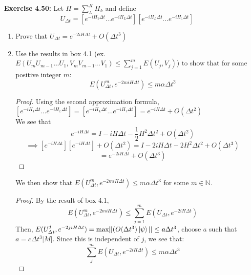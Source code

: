 \documentclass{article}
\begin{document}
\begin{tcolorbox}\textbf{Exercise 4.50:} Let $H = \sum_L^K H_k$ and define
	$$U_{\Delta t} = [e^{-iH_1 \Delta t} \dots e^{-i H_L \Delta t}][ e^{-i H_L \Delta t} \dots e^{-iH_1 \Delta t}]$$
	\begin{enumerate}
		\item Prove that $U_{\Delta t} = e^{-2i H \Delta t} + O(\Delta t^3)$
		\item Use the results in box 4.1 (ex. $E(U_m U_{m-1} \dots U_1, V_m V_{m-1} \dots V_1) \leq \sum^m_{j=1} E(U_j, V_j)$) to show that for some positive integer $m$:
			$$E(U^m_{\Delta t}, e^{-2miH\Delta t}) \leq m \alpha \Delta t^3$$
		\begin{proof}
		Using the second approximation formula, $[e^{-iH_1 \Delta t} \dots e^{-i H_L \Delta t}] = [ e^{-i H_L \Delta t} \dots e^{-iH_1 \Delta t}] = e^{-iH\Delta t} + O(\Delta t^2)$\\
			We see that
			$$e^{-iH\Delta t} = I - iH\Delta t - \frac12 H^2\Delta t^2 + O(\Delta t^2)$$
			$$\implies [e^{-iH\Delta t}] [e^{-iH \Delta t}]  + O(\Delta t^2) = I - 2iH\Delta t - 2H^2 \Delta t^2 + O(\Delta t^3) $$
			$$=e^{-2iH\Delta t} + O(\Delta t^3)$$
		\end{proof}
		We then show that $E(U^m_{\Delta t}, e^{-2miH\Delta t}) \leq m\alpha \Delta t^3$ for some $m \in \mathbb{N}$.
		\begin{proof}
			By the result of box 4.1,
			$$E(U^m_{\Delta t}, e^{-2miH\Delta t}) \leq \sum^m_{j=1} E(U_{\Delta t}, e^{-2iH \Delta t}) $$
		Then, $E(U^j_{\Delta t}, e^{-2jiH\Delta t})=  \text{max} ||(O(\Delta t^3)\ket{\psi}|| \leq a \Delta t^3$, choose $a$ such that $ a = c \Delta t^3 |M|$. Since this is independent of $j$, we see that:
		$$\sum^m_j E(U_{\Delta t}, e^{-2i H\Delta t}) \leq m \alpha  \Delta t^3$$
		\end{proof}
	\end{enumerate}
\end{tcolorbox}
\end{document}
